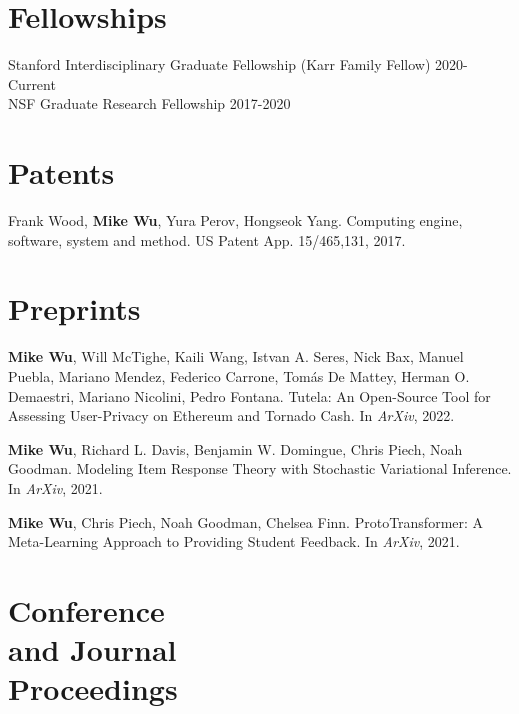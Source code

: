 \documentclass[margin, 10pt]{res} %
\begin{document}
\begin{resume}
\section{Fellowships}
Stanford Interdisciplinary Graduate Fellowship (Karr Family Fellow) \hfill 2020-Current \\
NSF Graduate Research Fellowship \hfill 2017-2020 \\


\section{Patents}

Frank Wood, \textbf{Mike Wu}, Yura Perov, Hongseok Yang. Computing engine, software, system and method. US Patent App. 15/465,131, 2017.



\section{Preprints}

\textbf{Mike Wu}, Will McTighe, Kaili Wang, Istvan A. Seres, Nick Bax, Manuel Puebla, Mariano Mendez, Federico Carrone, Tomás De Mattey, Herman O. Demaestri, Mariano Nicolini, Pedro Fontana. Tutela: An Open-Source Tool for Assessing User-Privacy on Ethereum and Tornado Cash. In \textit{ArXiv}, 2022.

\textbf{Mike Wu}, Richard L. Davis, Benjamin W. Domingue, Chris Piech, Noah Goodman. Modeling Item Response Theory with Stochastic Variational Inference. In \textit{ArXiv}, 2021.

\textbf{Mike Wu}, Chris Piech, Noah Goodman, Chelsea Finn. ProtoTransformer: A Meta-Learning Approach to Providing Student Feedback. In \textit{ArXiv}, 2021.

\section{Conference \\and Journal \\Proceedings}


\end{resume}
\end{document}
